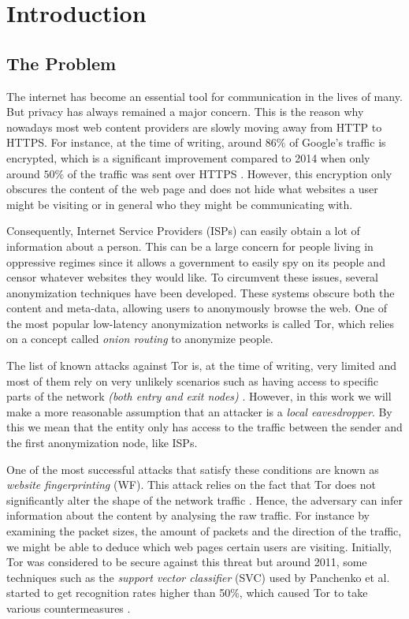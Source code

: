 \chapter{Introduction}

\section{The Problem}

The internet has become an essential tool for communication in the lives of many. But privacy has always remained a major concern.
This is the reason why nowadays most web content providers are slowly moving away from HTTP to HTTPS.
For instance, at the time of writing, around $86\%$ of Google's traffic is encrypted, which is a significant improvement compared to 2014 when only around $50\%$ of the traffic was sent over HTTPS \cite{google_transparancy}.
However, this encryption only obscures the content of the web page and does not hide what websites a user might be visiting or in general who they might be communicating with.

Consequently, Internet Service Providers (ISPs) can easily obtain a lot of information about a person.
This can be a large concern for people living in oppressive regimes since it allows a government to easily spy on its people and
censor whatever websites they would like. To circumvent these issues, several anonymization techniques have been developed.
These systems obscure both the content and meta-data, allowing users to anonymously browse the web.
One of the most popular low-latency anonymization networks is called Tor, which relies on a concept called \textit{onion routing} to anonymize people\cite{tor_project}.

The list of known attacks against Tor is, at the time of writing, very limited and most of them rely on very
unlikely scenarios such as having access to specific parts of the network \textit{(both entry and exit nodes)} \cite{tor_project}.
However, in this work we will make a more reasonable assumption that an attacker is a \textit{local eavesdropper}.
By this we mean that the entity only has access to the traffic between the sender and the first anonymization node, like ISPs.

One of the most successful attacks that satisfy these conditions are known as \textit{website fingerprinting} (WF).
This attack relies on the fact that Tor does not significantly alter the shape of the network traffic \cite{kfingerprinting}.
Hence, the adversary can infer information about the content by analysing the raw traffic.
For instance by examining the packet sizes, the amount of packets and the direction of the traffic, we might be able to deduce
which web pages certain users are visiting.
Initially, Tor was considered to be secure against this threat but around 2011, some techniques such as the \textit{support vector classifier} (SVC)
used by Panchenko et al. started to get recognition rates higher than 50\%, which caused Tor to take various countermeasures \cite{panchenko1,perry2011experimental}.

